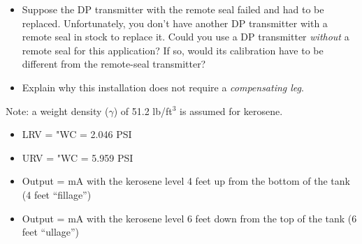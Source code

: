 \begin{itemize}
\item{} Suppose the DP transmitter with the remote seal failed and had to be replaced.  Unfortunately, you don't have another DP transmitter with a remote seal in stock to replace it.  Could you use a DP transmitter {\it without} a remote seal for this application?  If so, would its calibration have to be different from the remote-seal transmitter?
\item{} Explain why this installation does not require a {\it compensating leg}.
\end{itemize}






 
Note: a weight density ($\gamma$) of 51.2 lb/ft$^{3}$ is assumed for kerosene.

\begin{itemize}
\item{} LRV =  "WC = 2.046 PSI
\item{} URV =  "WC = 5.959 PSI
\end{itemize}

\begin{itemize}
\item{} Output =  mA with the kerosene level 4 feet up from the bottom of the tank (4 feet ``fillage'')
\item{} Output =  mA with the kerosene level 6 feet down from the top of the tank (6 feet ``ullage'')
\end{itemize}











